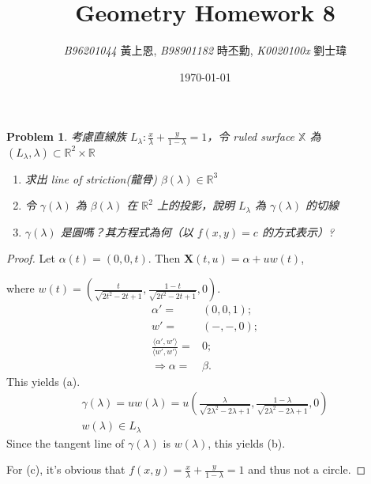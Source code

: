 \documentclass[10pt,a4paper]{article}
\newcommand{\LiHei}{\CJKfamily{lh}}
\newcounter{theProblemCounter}
\newtheorem{problem}[theProblemCounter]{Problem}
\begin{document}
\title{{Geometry Homework 8}}
\author{{\it{B96201044}} {\LiHei 黃上恩}, {\it{B98901182}} {\LiHei 時丕勳}, {\it{K0020100x}} {\LiHei 劉士瑋}}%
\date{\today}
\maketitle

\newcommand{\bx}{\mathbb{X}}
\newcommand{\bfx}{\mathbf{X}}
\newcommand{\sech}{\mbox{sech}}
\setcounter{theProblemCounter}{1}
\begin{problem}
考慮直線族 $L_\lambda: \frac{x}{\lambda} + \frac{y}{1-\lambda}=1$，令 ruled surface $\bx$ 為 $(L_\lambda, \lambda)\subset \mathbb{R}^2\times \mathbb{R}$
\begin{enumerate}
\item[(a)] 求出 line of striction(龍骨) $\beta(\lambda)\in\mathbb{R}^3$
\item[(b)] 令 $\gamma(\lambda)$ 為 $\beta(\lambda)$ 在 $\mathbb{R}^2$ 上的投影，說明 $L_\lambda$ 為 $\gamma(\lambda)$ 的切線
\item[(c)] $\gamma(\lambda)$ 是圓嗎？其方程式為何（以 $f(x,y)=c$ 的方式表示）?
\end{enumerate}
\end{problem}
\begin{proof}
Let $\alpha(t) = (0, 0, t)$. Then $\bfx(t, u) = \alpha + uw(t)$, \par  where $w(t) = (\frac t{\sqrt{2t^2 - 2t + 1}}, \frac{1-t}{\sqrt{2t^2 - 2t + 1}}, 0)$.
\begin{align*}
\alpha' =& (0, 0, 1); \\
w' =& (-, -, 0); \\
\frac{\langle \alpha', w'\rangle}{\langle w', w'\rangle} =& 0; \\
\Rightarrow \alpha =& \beta.
\end{align*}
This yields (a).
\begin{align*}
\gamma(\lambda) = uw(\lambda) = u(\frac {\lambda}{\sqrt{2\lambda^2 - 2\lambda + 1}}, \frac{1-\lambda}{\sqrt{2\lambda^2 - 2\lambda + 1}}, 0) \\
w(\lambda) \in L_{\lambda}
\end{align*}
Since the tangent line of $\gamma(\lambda)$ is $w(\lambda)$, this yields (b). \par
For (c), it's obvious that $f(x, y) = \frac{x}{\lambda} + \frac{y}{1-\lambda} = 1$ and thus not a circle.

\end{proof}
\end{document}
